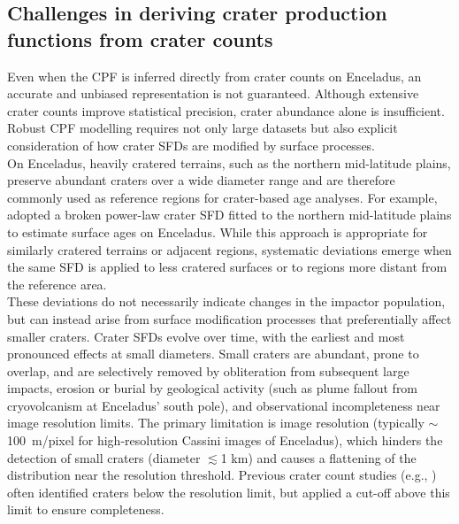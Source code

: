 \documentclass[preprint,11pt,3p,times,authoryear]{elsarticle}
\begin{document}
\subsection{Challenges in deriving crater production functions from crater counts}
Even when the CPF is inferred directly from crater counts on Enceladus, an accurate and unbiased representation is not guaranteed. Although extensive crater counts improve statistical precision, crater abundance alone is insufficient. Robust CPF modelling requires not only large datasets but also explicit consideration of how crater SFDs are modified by surface processes.\\

On Enceladus, heavily cratered terrains, such as the northern mid-latitude plains, preserve abundant craters over a wide diameter range and are therefore commonly used as reference regions for crater-based age analyses. For example, \citet{Wong2023} adopted a broken power-law crater SFD fitted to the northern mid-latitude plains \citep{Kirchoff2009} to estimate surface ages on Enceladus. While this approach is appropriate for similarly cratered terrains or adjacent regions, systematic deviations emerge when the same SFD is applied to less cratered surfaces or to regions more distant from the reference area.\\

These deviations do not necessarily indicate changes in the impactor population, but can instead arise from surface modification processes that preferentially affect smaller craters. Crater SFDs evolve over time, with the earliest and most pronounced effects at small diameters. Small craters are abundant, prone to overlap, and are selectively removed by obliteration from subsequent large impacts, erosion or burial by geological activity (such as plume fallout from cryovolcanism at Enceladus’ south pole), and observational incompleteness near image resolution limits. The primary limitation is image resolution (typically $\sim$100~m/pixel for high-resolution Cassini images of Enceladus), which hinders the detection of small craters (diameter $\lesssim$1 km) and causes a flattening of the distribution near the resolution threshold. Previous crater count studies (e.g., \citealt{Kirchoff2009, Kinczyk2024}) often identified craters below the resolution limit, but applied a cut-off above this limit to ensure completeness. \\
\end{document}
